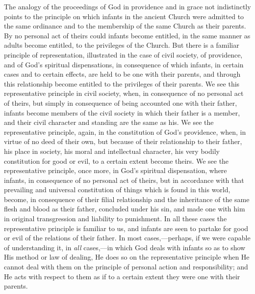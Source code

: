 \documentclass[
  english,
]{book}
\begin{document}
The analogy of the proceedings of God in providence and in grace not indistinctly points to the principle on which infants in the ancient Church were admitted to the same ordinance and to the membership of the same Church as their parents. By no personal act of theirs could infants become entitled, in the same manner as adults become entitled, to the privileges of the Church. But there is a familiar principle of representation, illustrated in the case of civil society, of providence, and of God's spiritual dispensations, in consequence of which infants, in certain cases and to certain effects, are held to be one with their parents, and through this relationship become entitled to the privileges of their parents. We see this representative principle in civil society, when, in consequence of no personal act of theirs, but simply in consequence of being accounted one with their father, infants become members of the civil society in which their father is a member, and their civil character and standing are the same as his. We see the representative principle, again, in the constitution of God's providence, when, in virtue of no deed of their own, but because of their relationship to their father, his place in society, his moral and intellectual character, his very bodily constitution for good or evil, to a certain extent become theirs. We see the representative principle, once more, in God's spiritual dispensation, where infants, in consequence of no personal act of theirs, but in accordance with that prevailing and universal constitution of things which is found in this world, become, in consequence of their filial relationship and the inheritance of the same flesh and blood as their father, concluded under his sin, and made one with him in original transgression and liability to punishment. In all these cases the representative principle is familiar to us, and infants are seen to partake for good or evil of the relations of their father. In most cases,---perhaps, if we were capable of understanding it, in \emph{all} cases,---in which God deals with infants so as to show His method or law of dealing, He does so on the representative principle when He cannot deal with them on the principle of personal action and responsibility; and He acts with respect to them as if to a certain extent they were one with their parents.
\end{document}
